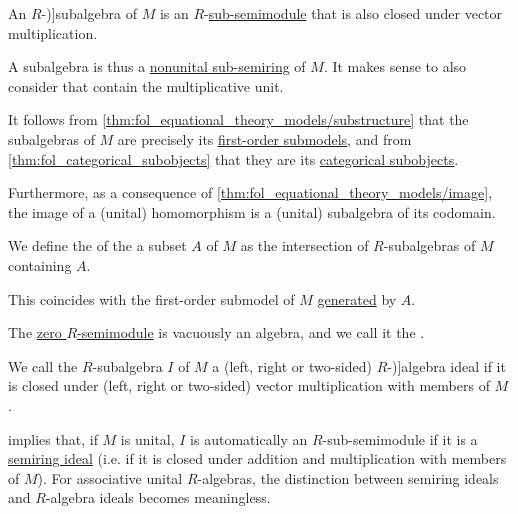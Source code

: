 \begin{definition}
\begin{thmenum}
     An \( R \)-\term[en=subalgebra (over ring) (\cite[429]{Bourbaki1998Algebra1to3})]{subalgebra} of \( M \) is an \( R \)-\hyperref[def:semimodule/subobject]{sub-semimodule} that is also closed under vector multiplication.

    A subalgebra is thus a \hyperref[def:semiring/subobject]{nonunital sub-semiring} of \( M \). It makes sense to also consider  that contain the multiplicative unit.

    It follows from \cref{thm:fol_equational_theory_models/substructure} that the subalgebras of \( M \) are precisely its \hyperref[def:fol_substructure/submodel]{first-order submodels}, and from \cref{thm:fol_categorical_subobjects} that they are its \hyperref[def:categorical_subobject]{categorical subobjects}.

    Furthermore, as a consequence of \cref{thm:fol_equational_theory_models/image}, the image of a (unital) homomorphism is a (unital) subalgebra of its codomain.

     We define the of the a subset \( A \) of \( M \) as the intersection of \( R \)-subalgebras of \( M \) containing \( A \).

    This coincides with the first-order submodel of \( M \) \hyperref[def:fol_generated_substructure]{generated} by \( A \).

     The \hyperref[def:semimodule/trivial]{zero \( R \)-semimodule} is vacuously an algebra, and we call it the .

     We call the \( R \)-subalgebra \( I \) of \( M \) a (left, right or two-sided) \( R \)-\term[en=ideal (\cite[430]{Bourbaki1998Algebra1to3})]{algebra ideal} if it is closed under (left, right or two-sided) vector multiplication with members of \( M \).

     implies that, if \( M \) is unital, \( I \) is automatically an \( R \)-sub-semimodule if it is a \hyperref[def:semiring_ideal]{semiring ideal} (i.e. if it is closed under addition and multiplication with members of \( M \)). For associative unital \( R \)-algebras, the distinction between semiring ideals and \( R \)-algebra ideals becomes meaningless.


\end{thmenum}
\end{definition}

